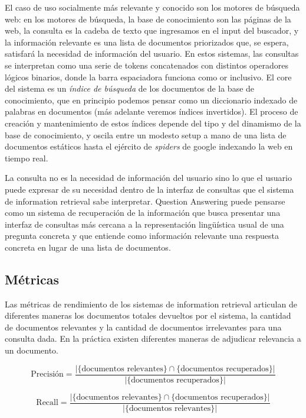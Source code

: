 El caso de uso socialmente más relevante y conocido son los motores de búsqueda web: en los motores de búsqueda, la base de conocimiento son las páginas de la web, la consulta es la cadeba de texto que ingresamos en el input del buscador, y la información relevante es una lista de documentos priorizados que, se espera, satisfará la necesidad de información del usuario. En estos sistemas, las consultas se interpretan como una serie de tokens concatenados con distintos operadores lógicos binarios, donde la barra espaciadora funciona como or inclusivo. El core del sistema es un \textit{índice de búsqueda} de los documentos de la base de conocimiento, que en principio podemos pensar como un diccionario indexado de palabras en documentos (más adelante veremos índices invertidos). El proceso de creación y mantenimiento de estos índices depende del tipo y del dinamismo de la base de conocimiento, y oscila entre un modesto setup a mano de una lista de documentos estáticos hasta el ejército de \textit{spiders} de google indexando la web en tiempo real. 

La consulta no es la necesidad de información del usuario sino lo que el usuario puede expresar de su necesidad dentro de la interfaz de consultas que el sistema de information retrieval sabe interpretar. Question Answering puede pensarse como un sistema de recuperación de la información que busca presentar una interfaz de consultas más cercana a la representación lingüística usual de una pregunta concreta y que entiende como información relevante una respuesta concreta en lugar de una lista de documentos. 

\subsection{Métricas}
Las métricas de rendimiento de los sistemas de information retrieval articulan de diferentes maneras los documentos totales devueltos por el sistema, la cantidad de documentos relevantes y la cantidad de documentos irrelevantes para una consulta dada. En la práctica existen diferentes maneras de adjudicar relevancia a un documento. 

\begin{equation}\label{eq:precision}
 \mbox{Precisión}=\frac{|\{\mbox{documentos relevantes}\}\cap\{\mbox{documentos recuperados}\}|}{|\{\mbox{documentos recuperados}\}|} 
\end{equation}

\begin{equation}\label{eq:recall}
  \mbox{Recall}=\frac{|\{\mbox{documentos relevantes}\}\cap\{\mbox{documentos recuperados}\}|}{|\{\mbox{documentos relevantes}\}|} 
\end{equation}

